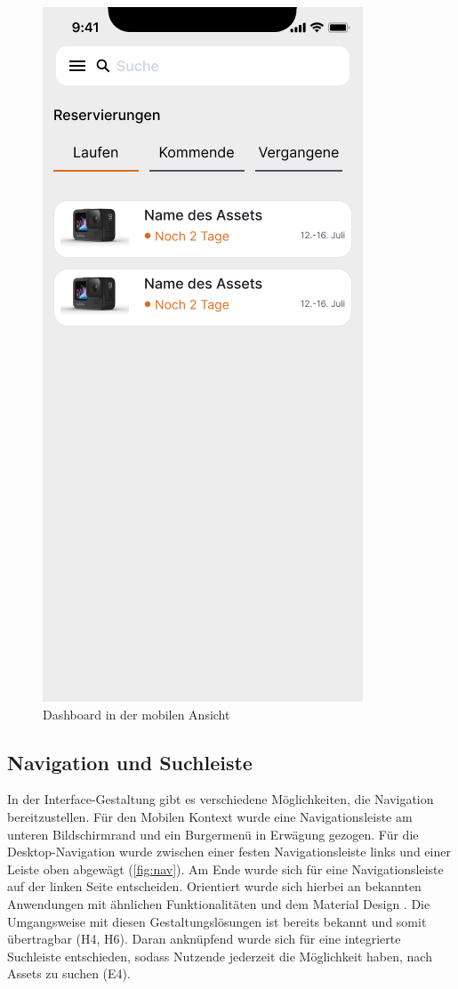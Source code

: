 \begin{figure}[h]
    \includegraphics[scale=0.3]{Bilder/Prototyp/Neu/V2.png}
    \caption[Dashboard in der mobilen Ansicht]{Dashboard in der mobilen Ansicht}
    \label{fig:home}
\end{figure}

\subsection{Navigation und Suchleiste}
In der Interface-Gestaltung gibt es verschiedene Möglichkeiten, die Navigation
bereitzustellen. Für den Mobilen Kontext wurde eine Navigationsleiste am unteren
Bildschirmrand und ein Burgermenü in Erwägung gezogen. Für die
Desktop-Navigation wurde zwischen einer festen Navigationsleiste links und einer
Leiste oben abgewägt (\ref{fig:nav}). Am Ende wurde sich für eine
Navigationsleiste auf der linken Seite entscheiden. Orientiert wurde sich
hierbei an bekannten Anwendungen mit ähnlichen Funktionalitäten und dem Material
Design \cite{google_material_2022}. Die Umgangsweise mit diesen
Gestaltungslösungen ist bereits bekannt und somit übertragbar (H4, H6). Daran
anknüpfend wurde sich für eine integrierte Suchleiste entschieden, sodass
Nutzende jederzeit die Möglichkeit haben, nach Assets zu suchen
\cite{google_material_2022} (E4).


